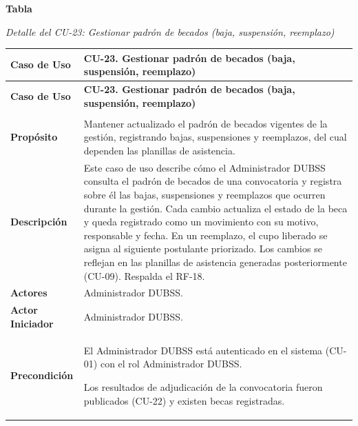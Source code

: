 \label{tab:detalle_cu23}
\noindent\textbf{Tabla~\thetable}\par\nopagebreak
\noindent\textit{Detalle del CU-23: Gestionar padrón de becados (baja, suspensión, reemplazo)}\par\nopagebreak
\begingroup\small\linespread{1}\selectfont
\begin{longtable}{>{\raggedright\arraybackslash}p{2.9cm} >{\raggedright\arraybackslash}p{12.6cm}}
\toprule
\textbf{Caso de Uso} & \textbf{CU-23. Gestionar padrón de becados (baja, suspensión, reemplazo)} \\
\midrule
\endfirsthead
\toprule
\textbf{Caso de Uso} & \textbf{CU-23. Gestionar padrón de becados (baja, suspensión, reemplazo)} \\
\midrule
\endhead
\endfoot
\bottomrule
\multicolumn{2}{l}{\textit{Nota.} Elaboración propia.} \\
\endlastfoot
\textbf{Propósito} & Mantener actualizado el padrón de becados vigentes de la gestión, registrando bajas, suspensiones y reemplazos, del cual dependen las planillas de asistencia. \\
\midrule
\textbf{Descripción} & Este caso de uso describe cómo el Administrador DUBSS consulta el padrón de becados de una convocatoria y registra sobre él las bajas, suspensiones y reemplazos que ocurren durante la gestión. Cada cambio actualiza el estado de la beca y queda registrado como un movimiento con su motivo, responsable y fecha. En un reemplazo, el cupo liberado se asigna al siguiente postulante priorizado. Los cambios se reflejan en las planillas de asistencia generadas posteriormente (CU-09). Respalda el RF-18. \\
\midrule
\textbf{Actores} & Administrador DUBSS. \\
\midrule
\textbf{Actor Iniciador} & Administrador DUBSS. \\
\midrule
\textbf{Precondición} & \vspace{-\baselineskip}\begin{cuvin}
    \item El Administrador DUBSS está autenticado en el sistema (CU-01) con el rol Administrador DUBSS.
    \item Los resultados de adjudicación de la convocatoria fueron publicados (CU-22) y existen becas registradas.
\end{cuvin} \\

\end{longtable}
